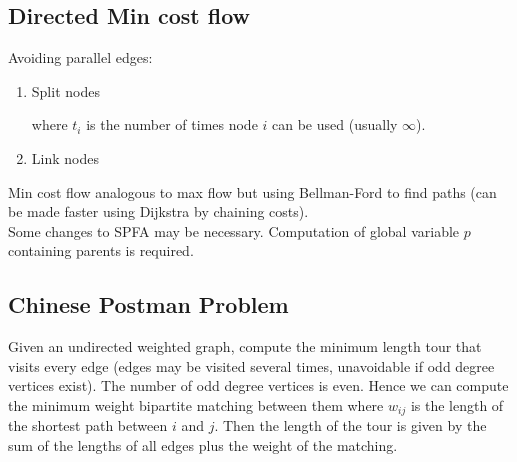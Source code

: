 \subsection{Directed Min cost flow}
Avoiding parallel edges:
\begin{enumerate}
\item Split nodes
\begin{center}
\end{center}
where $t_i$ is the number of times node $i$ can be used (usually $\infty$).\\

\item Link nodes
\begin{center}
\end{center}
\end{enumerate}



Min cost flow analogous to max flow but using Bellman-Ford to find paths (can be made faster using Dijkstra by chaining costs).\\



Some changes to SPFA may be necessary. Computation of global variable $p$ containing parents is required.

\subsection{Chinese Postman Problem}

Given an undirected weighted graph, compute the minimum length tour that visits every edge (edges may be visited several times, unavoidable if odd degree vertices exist). The number of odd degree vertices is even. Hence we can compute the minimum weight bipartite matching between them where $w_{ij}$ is the length of the shortest path between $i$ and $j$. Then the length of the tour is given by the sum of the lengths of all edges plus the weight of the matching.